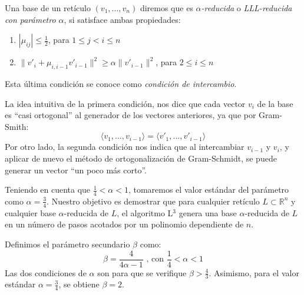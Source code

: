     \begin{definicion} \cite{artLagOdl} \label{def:5.5}
        Una base de un retículo $(v_{1}, ... , v_{n})$ diremos que es \textit{$\alpha$-reducida} o \textit{LLL-reducida con parámetro $\alpha$}, si satisface ambas propiedades:
        \begin{enumerate}
            \item $\left| \mu_{ij} \right| \leq \frac{1}{2}$, para $1 \leq j < i \leq n$
            \item $\| v'_{i} + \mu_{i,i-1} v'_{i-1} \|^{2} \geq \alpha\| v'_{i-1} \|^{2}$, para $2 \leq i \leq n$ 
        \end{enumerate}
        Esta última condición se conoce como \textit{condición de intercambio}.
    \end{definicion}

    La idea intuitiva de la primera condición, nos dice que cada vector $v_{i}$ de la base es ``casi ortogonal'' al generador de los vectores anteriores, ya que por Gram-Smith:
    \begin{equation}
        \langle v_{1}, ... , v_{i-1} \rangle = \langle v'_{1}, ... , v'_{i-1} \rangle
    \end{equation}
    Por otro lado, la segunda condición nos indica que al intercambiar $v_{i-1}$ y $v_{i}$, y aplicar de nuevo el método de ortogonalización de Gram-Schmidt, se puede generar un vector ``un poco más corto''. 

    Teniendo en cuenta que $\frac{1}{4} < \alpha < 1$, tomaremos el valor estándar del parámetro como $\alpha = \frac{3}{4}$. Nuestro objetivo es demostrar que para cualquier retículo $L \subset \mathbb{R}^{n}$ y cualquier base $\alpha$-reducida de $L$, el algoritmo L$^{3}$ genera una base $\alpha$-reducida de $L$ en un número de pasos acotados por un polinomio dependiente de $n$.

    \begin{definicion} \cite{tfgLag}
        Definimos el parámetro secundario $\beta$ como:
        \begin{equation}
            \beta = \frac{4}{4\alpha - 1} \text{ , con } \frac{1}{4} < \alpha < 1
        \end{equation}
        Las dos condiciones de $\alpha$ son para que se verifique $\beta > \frac{4}{3}$. Asimismo, para el valor estándar $\alpha = \frac{3}{4}$, se obtiene $\beta = 2$. 
    \end{definicion}
    
